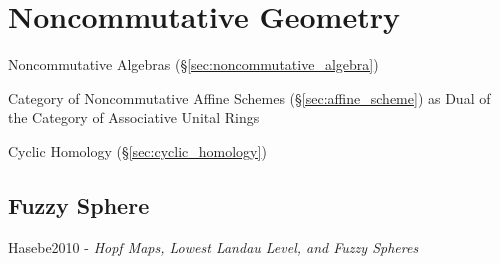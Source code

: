 \section{Noncommutative Geometry}\label{sec:noncommutative_geometry}

Noncommutative Algebras (\S\ref{sec:noncommutative_algebra})

Category of Noncommutative Affine Schemes (\S\ref{sec:affine_scheme}) as Dual of
the Category of Associative Unital Rings

Cyclic Homology (\S\ref{sec:cyclic_homology})



\subsection{Fuzzy Sphere}\label{sec:fuzzy_sphere}

Hasebe2010 - \emph{Hopf Maps, Lowest Landau Level, and Fuzzy Spheres}
